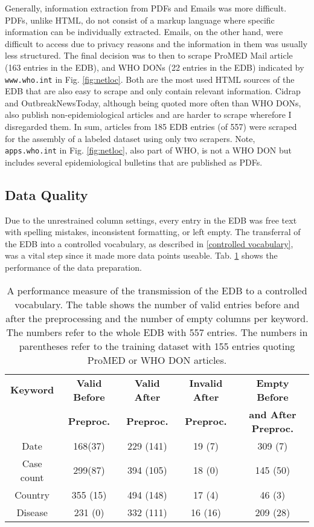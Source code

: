   Generally, information extraction from PDFs and Emails was more difficult.
  PDFs, unlike HTML, do not consist of a markup language where specific information can be individually extracted.
  Emails, on the other hand, were difficult to access due to privacy reasons and the information in them was usually less structured.
  The final decision was to then to scrape ProMED Mail article (163 entries in the EDB), and WHO DONs (22 entries in the EDB) indicated by \texttt{www.who.int} in Fig. \ref{fig:netloc}.
  Both are the most used HTML sources of the EDB that are also easy to scrape and only contain relevant information.
  Cidrap and OutbreakNewsToday, although being quoted more often than WHO DONs, also publish non-epidemiological articles and are harder to scrape wherefore I disregarded them.
  In sum, articles from 185 EDB entries (of 557) were scraped for the assembly of a labeled dataset using only two scrapers.
  Note, \texttt{apps.who.int} in Fig. \ref{fig:netloc}, also part of WHO, is not a WHO DON but includes several epidemiological bulletins that are published as PDFs.

\subsection{Data Quality}
  Due to the unrestrained column settings, every entry in the EDB was free text with spelling mistakes, inconsistent formatting, or left empty.
  The transferral of the EDB into a controlled vocabulary, as described in \ref{controlled vocabulary}, was a vital step since it made more data points useable.
  Tab. \ref{table:preprocessing performance} shows the performance of the data preparation.
  \begin{table}[h!]
    \centering
    \caption{A performance measure of the transmission of the EDB to a controlled vocabulary. The table shows the number of valid entries before and after the preprocessing and the number of empty columns per keyword. The numbers refer to the whole EDB with 557 entries. The numbers in parentheses refer to the training dataset with 155 entries quoting ProMED or WHO DON articles.}
    \begin{tabular}{@{}ccccc@{}}
      \toprule
      \textbf{Keyword} & \textbf{Valid Before} & \textbf{Valid After} & \textbf{Invalid After} & \textbf{Empty Before} \\
      & \textbf{Preproc.} & \textbf{Preproc.} & \textbf{Preproc.}  &\textbf{and After Preproc.} \\
      \midrule
      Date& 168(37)& 229 (141)&  19 (7)& 309 (7) \\
      Case count& 299(87)& 394 (105)& 18 (0)& 145 (50) \\
      Country& 355 (15) & 494 (148) &  17 (4)& 46 (3) \\
      Disease& 231 (0) & 332 (111)& 16 (16)& 209 (28) \\
      \bottomrule
    \end{tabular}
  \label{table:preprocessing performance}
  \end{table}

